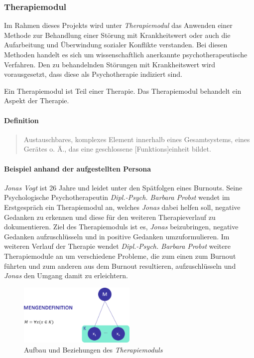 \subsubsection{Therapiemodul}
Im Rahmen dieses Projekts wird unter \emph{Therapiemodul} das Anwenden  einer Methode zur Behandlung einer Störung mit Krankheitswert oder auch die Aufarbeitung und Überwindung sozialer Konflikte verstanden. Bei diesen Methoden handelt es sich um wissenschaftlich anerkannte psychotherapeutische Verfahren. Den zu behandelnden Störungen mit Krankheitswert wird vorausgesetzt, dass diese als Psychotherapie indiziert sind.

Ein Therapiemodul ist Teil einer Therapie. Das Therapiemodul behandelt ein Aspekt der Therapie.

\paragraph{Definition}
\begin{quote}
Austauschbares, komplexes Element innerhalb eines Gesamtsystems, eines Gerätes o. Ä., das eine geschlossene [Funktions]einheit bildet. \cite{DudenMod70:online}
\end{quote}

\paragraph{Beispiel anhand der aufgestellten Persona}
 \emph{Jonas Vogt} ist 26 Jahre und leidet unter den Spätfolgen eines Burnouts. Seine Psychologische Psychotherapeutin \emph{Dipl.-Psych. Barbara Probst} wendet im Erstgespräch ein Therapiemodul an, welches \emph{Jonas} dabei helfen soll, negative Gedanken zu erkennen und diese für den weiteren Therapieverlauf zu dokumentieren. Ziel des Therapiemoduls ist es, \emph{Jonas} beizubringen, negative Gedanken aufzuschlüsseln und in positive Gedanken umzuformulieren. Im weiteren Verlauf der Therapie wendet \emph{Dipl.-Psych. Barbara Probst} weitere Therapiemodule an um verschiedene Probleme, die zum einen zum Burnout führten und zum anderen aus dem Burnout resultieren, aufzuschlüsseln und \emph{Jonas} den Umgang damit zu erleichtern.

\begin{figure}[h]
\centering
\includegraphics[width=0.5\textwidth]{pictures/moduldef}
\caption{Aufbau und Beziehungen des \emph{Therapiemoduls}}
\label{moduldef}
\end{figure}

